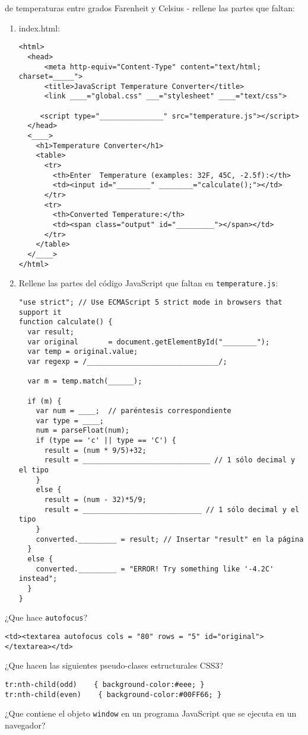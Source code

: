 de temperaturas entre grados Farenheit y Celsius - rellene las partes que faltan:
\begin{enumerate}
\item  index.html:
\begin{verbatim}
<html>
  <head>
      <meta http-equiv="Content-Type" content="text/html; charset=_____">
      <title>JavaScript Temperature Converter</title>
      <link ____="global.css" ___="stylesheet" ____="text/css">

     <script type="_______________" src="temperature.js"></script>
  </head>
  <____>
    <h1>Temperature Converter</h1>
    <table>
      <tr>
        <th>Enter  Temperature (examples: 32F, 45C, -2.5f):</th>
        <td><input id="________" ________="calculate();"></td>
      </tr>
      <tr>
        <th>Converted Temperature:</th>
        <td><span class="output" id="_________"></span></td>
      </tr>
    </table>
  </____>
</html>
\end{verbatim}

\item Rellene las partes del código JavaScript que faltan en \verb|temperature.js|:
\begin{verbatim}
"use strict"; // Use ECMAScript 5 strict mode in browsers that support it
function calculate() {
  var result;
  var original       = document.getElementById("________");
  var temp = original.value;
  var regexp = /_______________________________/;
  
  var m = temp.match(______);
  
  if (m) {
    var num = ____;  // paréntesis correspondiente
    var type = ____;
    num = parseFloat(num);
    if (type == 'c' || type == 'C') {
      result = (num * 9/5)+32;
      result = ______________________________ // 1 sólo decimal y el tipo
    }
    else {
      result = (num - 32)*5/9;
      result = ____________________________ // 1 sólo decimal y el tipo
    }
    converted._________ = result; // Insertar "result" en la página
  }
  else {
    converted._________ = "ERROR! Try something like '-4.2C' instead";
  }
}
\end{verbatim}
\end{enumerate}
\item  ¿Que hace \verb|autofocus|?
\begin{verbatim}
<td><textarea autofocus cols = "80" rows = "5" id="original"></textarea></td> 
\end{verbatim}
\item  ¿Que hacen las siguientes pseudo-clases estructurales CSS3?
\begin{verbatim}
tr:nth-child(odd)    { background-color:#eee; }
tr:nth-child(even)    { background-color:#00FF66; }
\end{verbatim}
\item ¿Que contiene el objeto \verb|window| en un programa JavaScript que se ejecuta en un navegador?


